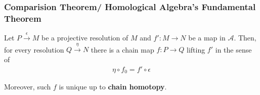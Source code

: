 \documentclass[Total.tex]{subfiles}
\begin{document}
				\subsubsection{Comparision Theorem/ Homological Algebra's Fundamental Theorem}
				\begin{theorem}
					Let $P\stackrel{\epsilon}{\rightarrow} M$ be a projective resolution of $M$ and $f':M\rightarrow N$ be a map in $\mathcal{A}$. Then, for every resolution $Q\stackrel{\eta}{\rightarrow} N$ there is a chain map $f:P\rightarrow Q$ lifting $f'$ in the sense of
					\begin{gather*}
						\eta\circ f_0=f'\circ\epsilon
					\end{gather*}
					\begin{center}
					\end{center}
					
					Moreover, such $f$ is unique up to \textbf{chain homotopy}.
				\end{theorem}
\end{document}
